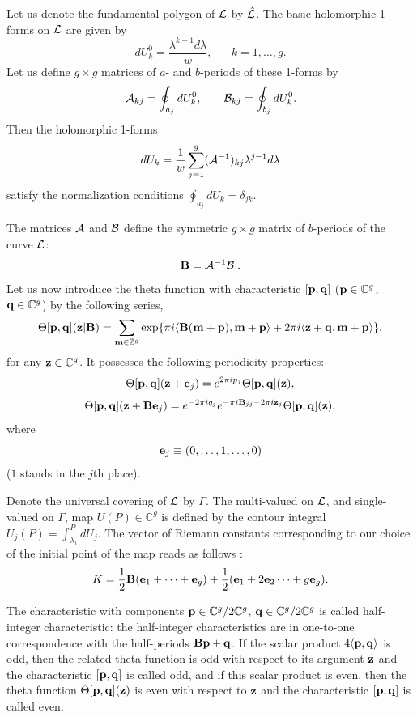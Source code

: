 \documentclass[11pt]{article}
\def\be{\begin{equation}}
\def\ee{\end{equation}}
\def\l{\lambda}
\def\Th{\Theta}
\def\eb{{\bf e}}
\def\Lh{\Gamma}
\def\B{{\bf B}}
\def\C{\mathbb{C}}
\def\Z{\mathbb{Z}}
\def\z{{\bf z}}
\def\m{{\bf m}}
\def\la{\label}
\def\f{\frac}
\def\L{{\cal L}}
\def\pb{{\bf p}}
\def\qb{{\bf q}}
\begin{document}



Let us denote the fundamental polygon of $\L$ by $\hat{\L}$.
The basic  holomorphic 1-forms on $\L$ 
are given by
\be
dU^0_k=\f{\l^{k-1}d\lambda}{w},\;\;\;\;\;\;k=1,\dots,g.
\la{dUk0}\ee
Let us define $g\times g$ matrices of $a$- and $b$-periods 
of these 1-forms by
\be
{\cal A}_{kj}=\oint_{a_j}dU^0_k,\;\;\;\;\;\;\;
{\cal B}_{kj}=\oint_{b_j}dU^0_k.
\la{AB}\ee
Then the holomorphic 1-forms 
\be
dU_k=\f{1}{w}\sum_{j=1}^g ({\cal A}^{-1})_{kj} \l^{j-1} d \lambda
\la{dUk}\ee
satisfy the normalization conditions
$\oint_{a_j} dU_k=\delta_{jk}$. 

The matrices ${\cal A}$ and ${\cal B}$ define the symmetric 
$g\times g$ matrix of $b$-periods of the curve $\L$:
$$\B= {\cal A}^{-1}{\cal B}\;.$$ 
Let us now introduce the theta function with characteristic $[\pb,\qb]$ ($\pb\in\C^g$, $\qb\in\C^g$) by the following series, 
\be
\Th[\pb,\qb](\z|\B)=\sum_{\m\in \Z^g} \exp\{\pi i \langle\B(\m+\pb),\m+\pb\rangle +2\pi i \langle\z+\qb,\m+\pb\rangle\},
\la{theta}\ee
for any $\z\in\C^g$. It possesses 
the following periodicity properties:
\be
\Th[\pb,\qb](\z+\eb_j)=
e^{2\pi i p_j} \Th[\pb,\qb](\z),
\la{pera}\ee
\be
\Th[\pb,\qb](\z+\B \eb_j)=e^{-2\pi i q_j}e^{-\pi i \B_{jj}-2\pi i \z_j}
\Th[\pb,\qb](\z),
\la{perb}\ee
where
\be
\eb_j\equiv (0,\dots,1,\dots,0)
\ee
($1$ stands in the $j$th place). 

Denote the universal covering of $\L$ by  $\Lh$. 
The multi-valued on $\L$, and single-valued on $\Lh$, map 
$U(P)\in \C^g$ is defined by the contour integral
$U_j(P)=\int_{\l_1}^P dU_j$.
The vector of Riemann constants corresponding to our choice of the initial point of the map reads as follows \cite{Fay}:
\be
K=\f{1}{2}\B(\eb_1+\dots+\eb_g) +\f{1}{2}(\eb_1+2\eb_2\dots+g\eb_g).       
\la{K}\ee

The characteristic with components $\pb\in\C^g/2\C^g$,
$\qb\in\C^g/2\C^g$ is called half-integer characteristic: the half-integer 
 characteristics are in one-to-one correspondence with the half-periods
$\B\pb+\qb$.
If the scalar product 
$4\langle\pb,\qb\rangle$ is odd, then the related theta function is 
odd with respect to its argument $\z$ and the characteristic $[\pb,\qb]$ is called odd, and if this scalar product is even, then the theta function $\Th[\pb,\qb](\z)$ is even with respect to $\z$ and the characteristic $[\pb,\qb]$ is called even.
\end{document}

